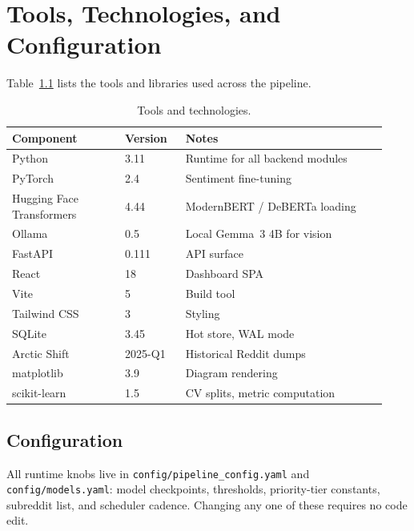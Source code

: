 \chapter{Tools, Technologies, and Configuration}\label{ch:tools}

Table~\ref{tab:tools} lists the tools and libraries used across the pipeline.

\begin{table}[htbp]\centering
\caption{Tools and technologies.}\label{tab:tools}
\small
\begin{tabular}{@{}p{0.28\linewidth}p{0.15\linewidth}p{0.50\linewidth}@{}}\toprule
\bfseries Component & \bfseries Version & \bfseries Notes\\\midrule
Python                    & 3.11        & Runtime for all backend modules\\
PyTorch                   & 2.4         & Sentiment fine-tuning\\
Hugging Face Transformers & 4.44        & ModernBERT / DeBERTa loading\\
Ollama                    & 0.5         & Local Gemma~3 4B for vision\\
FastAPI                   & 0.111       & API surface\\
React                     & 18          & Dashboard SPA\\
Vite                      & 5           & Build tool\\
Tailwind CSS              & 3           & Styling\\
SQLite                    & 3.45        & Hot store, WAL mode\\
Arctic Shift              & 2025-Q1     & Historical Reddit dumps\\
matplotlib                & 3.9         & Diagram rendering\\
scikit-learn              & 1.5         & CV splits, metric computation\\\bottomrule
\end{tabular}
\end{table}

\section{Configuration}
All runtime knobs live in \texttt{config/pipeline\_config.yaml} and
\texttt{config/models.yaml}: model checkpoints, thresholds, priority-tier
constants, subreddit list, and scheduler cadence.  Changing any one of these
requires no code edit.
